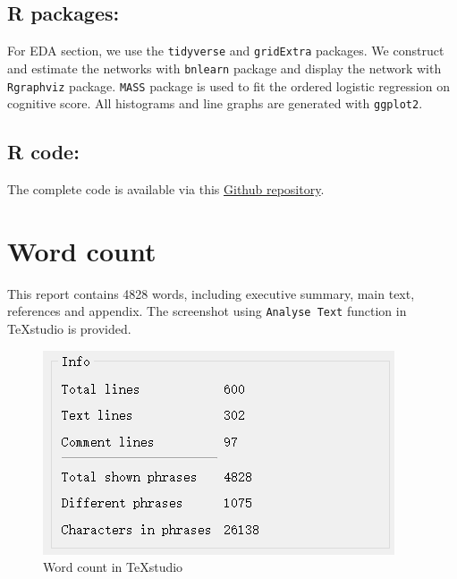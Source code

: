 \documentclass[11pt,twoside]{article}
\numberwithin{Theorem}{section}
\numberwithin{Definition}{section}
\numberwithin{Lemma}{section}
\numberwithin{Algorithm}{section}
\numberwithin{equation}{section}
\begin{document}
\subsection*{R packages:}

For EDA section, we use the \texttt{tidyverse} and \texttt{gridExtra} packages. We construct and estimate the networks with \texttt{bnlearn} package and display the network with \texttt{Rgraphviz} package. \texttt{MASS} package is used to fit the ordered logistic regression on cognitive score. All histograms and line graphs are generated with \texttt{ggplot2}.

\subsection*{R code: }
The complete code is available via this \href{https://github.com/Shi-Yile/Project-1-Dementia-Risk-Factors.git}{Github repository}.

\clearpage

\section*{Word count}

This report contains 4828 words, including executive summary, main text, references and appendix. The screenshot using  \texttt{Analyse Text} function in TeXstudio is provided.

\begin{figure}[!h]
	\centering
	\includegraphics{Images/word_count.png}
	\caption{Word count in TeXstudio}
\end{figure}
\end{document}
